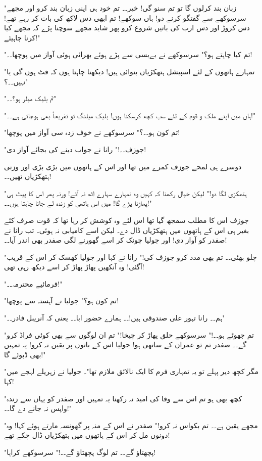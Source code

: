 "زبان بند کرلوں گا تو تم سنو گی! خیر۔۔ تم خود ہی اپنی زبان بند کرو اور مجھے سرسوکھے سے گفتگو کرنے دو! ہاں سوکھے! تم ابھی دس لاکھ کی بات کر رہے تھے! دس کروڑ اور دس ارب کی باتیں شروع کرو پھر شاید مجھے سوچنا پڑے کہ مجھے کیا کرنا چاہیئے!"

"تم کیا چاہتے ہو؟" سرسوکھے نے بےبسی سے پڑے ہوئے بھرائی ہوئی آواز میں پوچھا۔۔!

"تمہارے ہاتھوں کے لئے اسپیشل ہتھکڑیاں بنوائی ہیں! دیکھنا چاہتا ہوں کہ فٹ ہوں گی یا نہیں۔۔؟"

"تم بلیک میلر ہو؟۔۔"

"ہاں میں اپنے ملک و قوم کے لئے سب کچھ کرسکتا ہوں! بلیک میلنگ تو تفریحاً بھی ہوجاتی ہے۔۔!"

"تم کون ہو۔۔؟" سرسوکھے نے خوف زدہ سی آواز میں پوچھا!

"جوزف۔۔!" رانا نے جواب دینے کی بجائے آواز دی!

دوسرے ہی لمحے جوزف کمرے میں تھا اور اس کے ہاتھوں میں بڑی بڑی اور وزنی ہتھکڑیاں تھیں۔۔!

"ہتھکڑی لگا دو!" لیکن خیال رکھنا کہ کہیں وہ تمہارے سہارے اٹھ نہ آئے! ورنہ پھر اس کا پیٹ ہی پھاڑنا پڑے گا! میں اس ہاتھی کو زندہ لے جانا چاہتا ہوں۔۔!"

جوزف اس کا مطلب سمجھ گیا تھا اس لئے وہ کوشش کر رہا تھا کہ قوت صرف کئے بغیر ہی اس کے ہاتھوں میں ہتھکڑیاں ڈال دے۔ لیکن اسے کامیابی نہ ہوئی۔ تب رانا نے صفدر کو آواز دی! اور جولیا چونک کر اسے گھورنے لگی صفدر بھی اندر آیا۔۔!

"چلو بھئی۔۔ تم بھی مدد کرو جوزف کی!" رانا نے کہا اور جولیا کھسک کر اس کے قریب آگئی! وہ آنکھیں پھاڑ پھاڑ کر اسے دیکھ رہی تھی!

"فرمائیے محترمہ۔۔!"

"تم کون ہو؟" جولیا نے آہستہ سے پوچھا!

"ہم۔۔ رانا تہور علی صندوقی ہیں!۔۔ ہمارے حضور ابا۔۔ یعنی کہ آنریبل فادر۔۔"

"تم جھوٹے ہو۔۔!" سرسوکھے حلق پھاڑ کر چیخا!" تم ان لوگوں سے بھی کوئی فراڈ کرو گے۔۔ صفدر تم تو عمران کے ساتھی ہو! جولیا اس کے باتوں پر یقین نہ کرو! یہ تمہیں بھی ڈبوئے گا!"

"مگر کچھ دیر پہلے تو یہ تمہاری فرم کا ایک نالائق ملازم تھا"۔ جولیا نے زہریلے لہجے میں کہا!

"کچھ بھی ہو تم اس سے وفا کی امید نہ رکھنا یہ تمہیں اور صفدر کو یہاں سے زندہ واپس نہ جانے دے گا۔۔!"

"مجھے یقین ہے۔۔ تم بکواس نہ کرو!" صفدر نے اس کے منہ پر گھونسہ مارتے ہوئے کہا! وہ دونوں مل کر اس کے ہاتھوں میں ہتھکڑیاں ڈال چکے تھے!

"پچھتاؤ گے۔۔ تم لوگ پچھتاؤ گے۔۔!" سرسوکھے کراہا!

